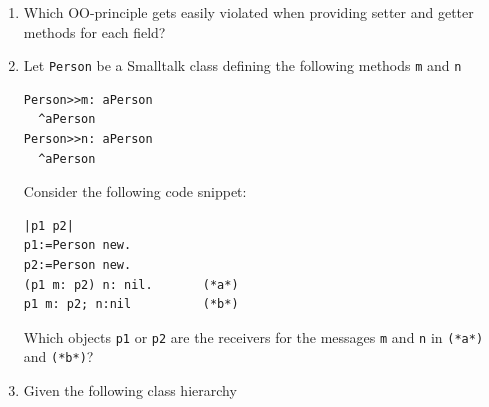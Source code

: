 \documentclass{article}
\begin{document}
\begin{enumerate}
\item Which OO-principle gets easily violated when providing setter
  and getter methods for each field?  
\item Let \texttt{Person} be a Smalltalk class defining the following
  methods \texttt{m} and \texttt{n}
\begin{lstlisting}[basicstyle=\small]
Person>>m: aPerson	
  ^aPerson
Person>>n: aPerson	
  ^aPerson
\end{lstlisting}
Consider the following code snippet:
\begin{lstlisting}[basicstyle=\small]
|p1 p2| 
p1:=Person new.
p2:=Person new.
(p1 m: p2) n: nil.       (*a*) 
p1 m: p2; n:nil          (*b*)
\end{lstlisting}
Which objects \lstinline!p1! or \lstinline!p2! are the receivers for the
messages \lstinline!m! and \lstinline!n! in \lstinline!(*a*)! and
\lstinline!(*b*)!?  

\item Given the following class
  hierarchy \\
\begin{center}

\end{center}
\end{enumerate}
\end{document}
